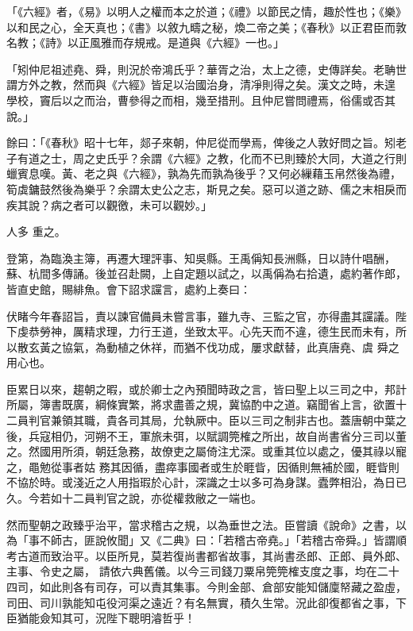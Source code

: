 \begin{pinyinscope}
 「《六經》者，《易》以明人之權而本之於道；《禮》以節民之情，趣於性也；《樂》以和民之心，全天真也；《書》以敘九疇之秘，煥二帝之美；《春秋》以正君臣而敦名教；《詩》以正風雅而存規戒。是道與《六經》一也。」



 「矧仲尼祖述堯、舜，則況於帝鴻氏乎？華胥之治，太上之德，史傳詳矣。老聃世謂方外之教，然而與《六經》皆足以治國治身，清凈則得之矣。漢文之時，未遑
 學校，竇后以之而治，曹參得之而相，幾至措刑。且仲尼嘗問禮焉，俗儒或否其說。」



 餘曰：「《春秋》昭十七年，郯子來朝，仲尼從而學焉，俾後之人敦好問之旨。矧老子有道之士，周之史氏乎？余謂《六經》之教，化而不已則臻於大同，大道之行則蠟賓息嘆。黃、老之與《六經》，孰為先而孰為後乎？又何必繅藉玉帛然後為禮，筍虡鏞鼓然後為樂乎？余謂太史公之志，斯見之矣。惡可以道之跡、儒之末相戾而疾其說？病之者可以觀徼，未可以觀妙。」



 人多
 重之。



 登第，為臨渙主簿，再遷大理評事、知吳縣。王禹偁知長洲縣，日以詩什唱酬，蘇、杭間多傳誦。後並召赴闕，上自定題以試之，以禹偁為右拾遺，處約著作郎，皆直史館，賜緋魚。會下詔求讜言，處約上奏曰：



 伏睹今年春詔旨，責以諫官備員未嘗言事，雖九寺、三監之官，亦得盡其讜議。陛下虔恭勞神，厲精求理，力行王道，坐致太平。心先天而不違，德生民而未有，所以散玄黃之協氣，為動植之休祥，而猶不伐功成，屢求獻替，此真唐堯、虞
 舜之用心也。



 臣累日以來，趨朝之暇，或於卿士之內預聞時政之言，皆曰聖上以三司之中，邦計所屬，簿書既廣，綱條實繁，將求盡善之規，冀協酌中之道。竊聞省上言，欲置十二員判官兼領其職，貴各司其局，允執厥中。臣以三司之制非古也。蓋唐朝中葉之後，兵寇相仍，河朔不王，軍旅未弭，以賦調筦榷之所出，故自尚書省分三司以董之。然國用所須，朝廷急務，故僚吏之屬倚注尤深。或重其位以處之，優其祿以寵之，黽勉從事者姑
 務其因循，盡瘁事國者或生於睚眥，因循則無補於國，睚眥則不協於時。或淺近之人用指瑕於心計，深識之士以多可為身謀。蠹弊相沿，為日已久。今若如十二員判官之說，亦從權救敝之一端也。



 然而聖朝之政臻乎治平，當求稽古之規，以為垂世之法。臣嘗讀《說命》之書，以為「事不師古，匪說攸聞」又《二典》曰：「若稽古帝堯。」「若稽古帝舜。」皆謂順考古道而致治平。以臣所見，莫若復尚書都省故事，其尚書丞郎、正郎、員外郎、主事、令史之屬，
 請依六典舊儀。以今三司錢刀粟帛筦筦榷支度之事，均在二十四司，如此則各有司存，可以責其集事。今則金部、倉部安能知儲廩帑藏之盈虛，司田、司川孰能知屯役河渠之遠近？有名無實，積久生常。況此卻復都省之事，下臣猶能僉知其可，況陛下聰明濬哲乎！




\end{pinyinscope}
